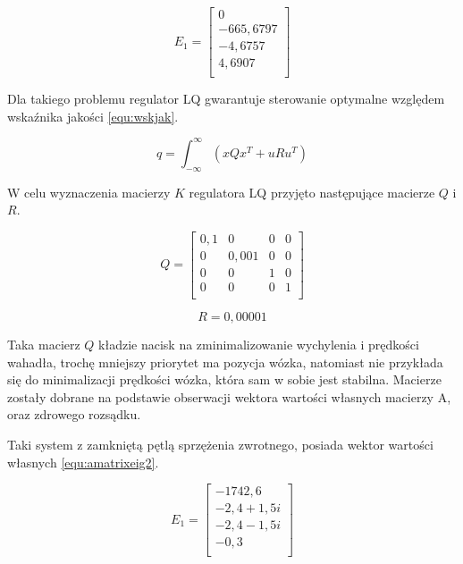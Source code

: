 \documentclass[12pt]{article}
\begin{document}
\begin{equation}
    E_1 = 
    \begin{bmatrix}
              0\\
      -665,6797\\
        -4,6757\\
         4,6907\\
    \end{bmatrix}
    \label{equ:amatrixeig1}
\end{equation}

Dla takiego problemu regulator LQ gwarantuje sterowanie optymalne względem
wskaźnika jakości \eqref{equ:wskjak}.

\begin{equation}
    q = \int_{-\infty}^{\infty}(xQx^T + uRu^T)
    \label{equ:wskjak}
\end{equation}

W celu wyznaczenia macierzy $K$ regulatora LQ przyjęto następujące macierze $Q$
i $R$.

\begin{equation}
    Q = 
    \begin{bmatrix}
        0,1 & 0 & 0 & 0\\
        0 & 0,001 & 0 & 0\\
        0 & 0 & 1 & 0\\
        0 & 0 & 0 & 1\\
    \end{bmatrix}
    \label{equ:lqq}
\end{equation}

\begin{equation}
    R = 0,00001
    \label{equ:lqr}
\end{equation}

Taka macierz $Q$ kładzie nacisk na zminimalizowanie wychylenia i prędkości
wahadła, trochę mniejszy priorytet ma pozycja wózka, natomiast nie przykłada się
do minimalizacji prędkości wózka, która sam w sobie jest stabilna. Macierze
zostały dobrane na podstawie obserwacji wektora wartości własnych macierzy A,
oraz zdrowego rozsądku.

Taki system z zamkniętą pętlą sprzężenia zwrotnego, posiada wektor wartości
własnych \eqref{equ:amatrixeig2}.

\begin{equation}
    E_1 = 
    \begin{bmatrix}
      -1742,6\\
      -2,4 + 1,5i\\
      -2,4 - 1,5i\\
      -0,3\\
    \end{bmatrix}
    \label{equ:amatrixeig2}
\end{equation}
\end{document}
